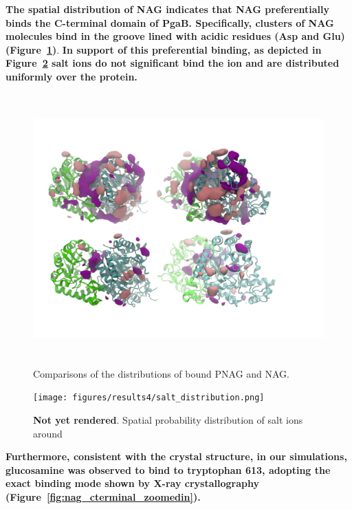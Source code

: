 \textbf{The spatial distribution of NAG indicates that NAG preferentially binds the C-terminal domain of PgaB. Specifically, clusters of NAG molecules bind in the groove lined with acidic residues (Asp and Glu) (Figure~\ref{fig:pnag_nag_overlapped_zoomedout})}.  \textbf{In support of this preferential binding,  as depicted in Figure~\ref{fig:salt_density_distribution} salt ions do not significant bind the ion and are distributed uniformly over the protein.}

\begin{figure}
\centering
\includegraphics[height=4.1in, width=6.23in]{figures/results4/pnag_nag_sdf_zoomedout.png}
\caption{Comparisons of the distributions of bound PNAG and NAG.}
\label{fig:pnag_nag_overlapped_zoomedout}
\end{figure}

\begin{figure}
\centering
\texttt{[image: figures/results4/salt\_distribution.png]}
\caption[Ionic distribution]{\textbf{Not yet rendered}. Spatial probability distribution of salt ions around \pgab}
\label{fig:salt_density_distribution}
\end{figure}

\textbf{Furthermore, consistent with the crystal structure, in our simulations, glucosamine was observed to bind to tryptophan 613, adopting the exact binding mode shown by X-ray crystallography (Figure~\ref{fig:nag_cterminal_zoomedin}).}

